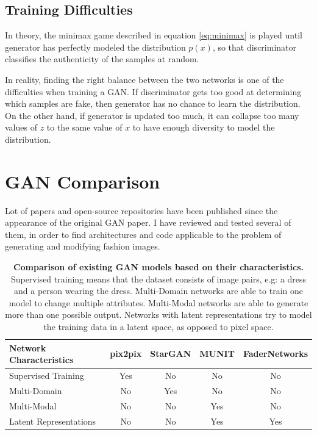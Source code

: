 \documentclass{article}
\begin{document}
\subsection{Training Difficulties}
In theory, the minimax game described in equation \ref{eq:minimax} is played until generator has perfectly modeled the distribution $p(x)$, so that discriminator classifies the authenticity of the samples at random. 

In reality, finding the right balance between the two networks is one of the difficulties when training a GAN. If discriminator gets too good at determining which samples are fake, then generator has no chance to learn the distribution. On the other hand, if generator is updated too much, it can collapse too many values of $z$ to the same value of $x$ to have enough diversity to model the distribution.

\section{GAN Comparison}
Lot of papers and open-source repositories have been published since the appearance of the original GAN paper. I have reviewed and tested several of them, in order to find architectures and code applicable to the problem of generating and modifying fashion images. 

\begin{table}
\centering
\begin{tabular}{l*{4}{c}}
Network Characteristics & pix2pix &	StarGAN	& MUNIT	& FaderNetworks \\
\hline
Supervised Training		& Yes & No & No & No \\
Multi-Domain  			& No  & Yes & No & No \\
Multi-Modal				& No & No & Yes & No \\
Latent Representations	& No & No & Yes & Yes \\
\end{tabular}
\caption{\label{tab:gan_comp}\textbf{Comparison of existing GAN models based on their characteristics.} Supervised training means that the dataset consists of image pairs, e.g: a dress and a person wearing the dress. Multi-Domain networks are able to train one model to change multiple attributes. Multi-Modal networks are able to generate more than one possible output. Networks with latent representations try to model the training data in a latent space, as opposed to pixel space.}
\end{table}
\end{document}
